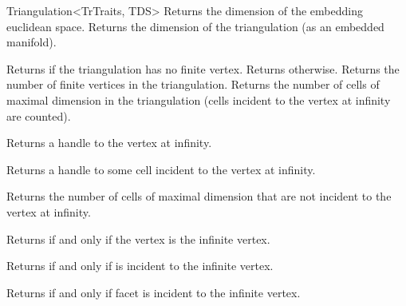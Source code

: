 \begin{ccRefClass}{Triangulation<TrTraits, TDS>}
%
{Returns the dimension of the embedding euclidean space.}
\ccGlue
{}%
{Returns the dimension of the triangulation (as an embedded manifold).}

%
{Returns  if the triangulation has no finite vertex. Returns
 otherwise.}
\ccGlue
{}%
{Returns the number of finite vertices in the triangulation.}
\ccGlue
{}%
{Returns the number of cells of maximal dimension in the triangulation
(cells incident to the vertex at infinity are counted).}

%
{Returns a handle to the vertex at infinity.}

%
{Returns a handle to some cell incident to the vertex at infinity.}


%
{Returns the number of cells of maximal dimension that are not
  incident to the vertex at infinity.}




{Returns  if and only if the vertex  is the infinite vertex.}

\ccGlue

{Returns  if and only if  is incident to the infinite vertex.
}

\ccGlue

{Returns  if and only if facet  is incident to the infinite
vertex. 
}

\ccGlue



\end{ccRefClass}
